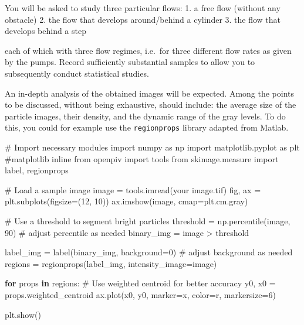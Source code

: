 \documentclass[
  english,
  letterpaper,
  numbers=noendperiod,
  DIV=13]{scrreprt}
\newenvironment{Shaded}{\begin{snugshade}}{\end{snugshade}}
\newcommand{\CommentTok}[1]{\textcolor[rgb]{0.37,0.37,0.37}{#1}}
\newcommand{\ControlFlowTok}[1]{\textcolor[rgb]{0.00,0.23,0.31}{\textbf{#1}}}
\newcommand{\DecValTok}[1]{\textcolor[rgb]{0.68,0.00,0.00}{#1}}
\newcommand{\ImportTok}[1]{\textcolor[rgb]{0.00,0.46,0.62}{#1}}
\newcommand{\KeywordTok}[1]{\textcolor[rgb]{0.00,0.23,0.31}{\textbf{#1}}}
\newcommand{\NormalTok}[1]{\textcolor[rgb]{0.00,0.23,0.31}{#1}}
\newcommand{\OperatorTok}[1]{\textcolor[rgb]{0.37,0.37,0.37}{#1}}
\newcommand{\StringTok}[1]{\textcolor[rgb]{0.13,0.47,0.30}{#1}}
\begin{document}
You will be asked to study three particular flows: 1. a free flow
(without any obstacle) 2. the flow that develops around/behind a
cylinder 3. the flow that develops behind a step

each of which with three flow regimes, i.e.~for three different flow
rates as given by the pumps. Record sufficiently substantial samples to
allow you to subsequently conduct statistical studies.

An in-depth analysis of the obtained images will be expected. Among the
points to be discussed, without being exhaustive, should include: the
average size of the particle images, their density, and the dynamic
range of the gray levels. To do this, you could for example use the
\texttt{regionprops} library adapted from Matlab.

\begin{Shaded}
\begin{Highlighting}[]
\CommentTok{\# Import necessary modules}
\ImportTok{import}\NormalTok{ numpy }\ImportTok{as}\NormalTok{ np}
\ImportTok{import}\NormalTok{ matplotlib.pyplot }\ImportTok{as}\NormalTok{ plt}
\CommentTok{\#matplotlib inline}
\ImportTok{from}\NormalTok{ openpiv }\ImportTok{import}\NormalTok{ tools}
\ImportTok{from}\NormalTok{ skimage.measure }\ImportTok{import}\NormalTok{ label, regionprops}

\CommentTok{\# Load a sample image}
\NormalTok{image }\OperatorTok{=}\NormalTok{ tools.imread(}\StringTok{\textquotesingle{}your image.tif\textquotesingle{}}\NormalTok{)}
\NormalTok{fig, ax }\OperatorTok{=}\NormalTok{ plt.subplots(figsize}\OperatorTok{=}\NormalTok{(}\DecValTok{12}\NormalTok{, }\DecValTok{10}\NormalTok{))}
\NormalTok{ax.imshow(image, cmap}\OperatorTok{=}\NormalTok{plt.cm.gray)}

\CommentTok{\# Use a threshold to segment bright particles}
\NormalTok{threshold }\OperatorTok{=}\NormalTok{ np.percentile(image, }\DecValTok{90}\NormalTok{)  }\CommentTok{\# adjust percentile as needed}
\NormalTok{binary\_img }\OperatorTok{=}\NormalTok{ image }\OperatorTok{\textgreater{}}\NormalTok{ threshold}

\NormalTok{label\_img }\OperatorTok{=}\NormalTok{ label(binary\_img, background}\OperatorTok{=}\DecValTok{0}\NormalTok{) }\CommentTok{\# adjust background as needed}
\NormalTok{regions }\OperatorTok{=}\NormalTok{ regionprops(label\_img, intensity\_image}\OperatorTok{=}\NormalTok{image)}

\ControlFlowTok{for}\NormalTok{ props }\KeywordTok{in}\NormalTok{ regions:}
    \CommentTok{\# Use weighted centroid for better accuracy}
\NormalTok{    y0, x0 }\OperatorTok{=}\NormalTok{ props.weighted\_centroid}
\NormalTok{    ax.plot(x0, y0, marker}\OperatorTok{=}\StringTok{\textquotesingle{}x\textquotesingle{}}\NormalTok{, color}\OperatorTok{=}\StringTok{\textquotesingle{}r\textquotesingle{}}\NormalTok{, markersize}\OperatorTok{=}\DecValTok{6}\NormalTok{)}

\NormalTok{plt.show()}
\end{Highlighting}
\end{Shaded}
\end{document}
